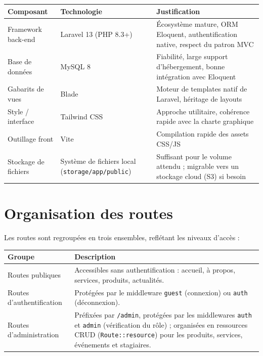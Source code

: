 \documentclass[11pt,a4paper]{report}
\begin{document}
\begin{center}
\renewcommand{\arraystretch}{1.3}
\begin{tabular}{L{3.4cm} L{4cm} L{4.5cm}}
\toprule
{}
\textbf{Composant} & \textbf{Technologie} & \textbf{Justification} \\
\midrule
Framework back-end & Laravel 13 (PHP 8.3+) & Écosystème mature, ORM Eloquent,
authentification native, respect du patron MVC \\
\addlinespace
Base de données & MySQL 8 & Fiabilité, large support d'hébergement, bonne
intégration avec Eloquent \\
\addlinespace
Gabarits de vues & Blade & Moteur de templates natif de Laravel, héritage de
layouts \\
\addlinespace
Style / interface & Tailwind CSS & Approche utilitaire, cohérence rapide
avec la charte graphique \\
\addlinespace
Outillage front & Vite & Compilation rapide des assets CSS/JS \\
\addlinespace
Stockage de fichiers & Système de fichiers local (\texttt{storage/app/public}) &
Suffisant pour le volume attendu ; migrable vers un stockage cloud (S3) si
besoin \\
\bottomrule
\end{tabular}
\end{center}

\section{Organisation des routes}

Les routes sont regroupées en trois ensembles, reflétant les niveaux d'accès :

\begin{center}
\renewcommand{\arraystretch}{1.3}
\begin{tabular}{L{3.2cm} L{9.4cm}}
\toprule
{}
\textbf{Groupe} & \textbf{Description} \\
\midrule
Routes publiques & Accessibles sans authentification : accueil, à propos,
services, produits, actualités. \\
\addlinespace
Routes d'authentification & Protégées par le middleware \texttt{guest}
(connexion) ou \texttt{auth} (déconnexion). \\
\addlinespace
Routes d'administration & Préfixées par \texttt{/admin}, protégées par les
middlewares \texttt{auth} et \texttt{admin} (vérification du rôle) ;
organisées en ressources CRUD (\texttt{Route::resource}) pour les produits,
services, événements et stagiaires. \\
\bottomrule
\end{tabular}
\end{center}
\end{document}
